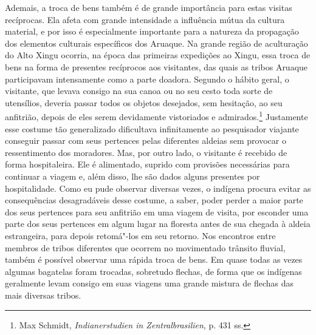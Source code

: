 Ademais, a troca de bens também é de grande importância para estas
visitas recíprocas. Ela afeta com grande intensidade a influência mútua
da cultura material, e por isso é especialmente importante para a
natureza da propagação dos elementos culturais específicos dos Aruaque.
Na grande região de aculturação do Alto Xingu ocorria, na época das
primeiras expedições ao Xingu, essa troca de bens na forma de presentes
recíprocos aos visitantes, das quais as tribos Aruaque participavam
intensamente como a parte doadora. Segundo o hábito geral, o
visitante, que levava consigo na sua canoa ou no seu cesto toda sorte
de utensílios, deveria passar todos os objetos desejados, sem hesitação,
ao seu anfitrião, depois de eles serem devidamente vistoriados e
admirados.\footnote{Max Schmidt, \emph{Indianerstudien in
  Zentralbrasilien}, p. 431 ss.} Justamente esse costume tão
generalizado dificultava infinitamente ao pesquisador viajante conseguir
passar com seus pertences pelas diferentes aldeias sem provocar o
ressentimento dos moradores. Mas, por outro lado, o visitante é recebido
de forma hospitaleira. Ele é alimentado, suprido com provisões
necessárias para continuar a viagem e, além disso, lhe são dados alguns
presentes por hospitalidade. Como eu pude observar diversas vezes, o
indígena procura evitar as consequências desagradáveis desse costume, a
saber, poder perder a maior parte dos seus pertences para seu anfitrião
em uma viagem de visita, por esconder uma parte dos seus pertences em
algum lugar na floresta antes de sua chegada à aldeia estrangeira, para
depois retomá"-los em seu retorno. Nos encontros entre membros de tribos
diferentes que ocorrem no movimentado trânsito fluvial, também é
possível observar uma rápida troca de bens. Em quase todas as vezes
algumas bagatelas foram trocadas, sobretudo flechas, de forma que os
indígenas geralmente levam consigo em suas viagens uma grande mistura de
flechas das mais diversas tribos.


